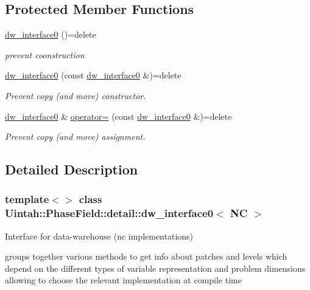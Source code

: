 \subsection*{Protected Member Functions}
\begin{DoxyCompactItemize}
\item 
\hyperlink{classUintah_1_1PhaseField_1_1detail_1_1dw__interface0_3_01NC_01_4_aad7b82c8d10817240284f428f6dbc7ad}{dw\+\_\+interface0} ()=delete
\begin{DoxyCompactList}\small\item\em prevent coonstruction \end{DoxyCompactList}\item 
\hyperlink{classUintah_1_1PhaseField_1_1detail_1_1dw__interface0_3_01NC_01_4_ac163b15aa058e87032713e07a618ccb5}{dw\+\_\+interface0} (const \hyperlink{classUintah_1_1PhaseField_1_1detail_1_1dw__interface0}{dw\+\_\+interface0} \&)=delete
\begin{DoxyCompactList}\small\item\em Prevent copy (and move) constructor. \end{DoxyCompactList}\item 
\hyperlink{classUintah_1_1PhaseField_1_1detail_1_1dw__interface0}{dw\+\_\+interface0} \& \hyperlink{classUintah_1_1PhaseField_1_1detail_1_1dw__interface0_3_01NC_01_4_af04801048a103c1b86d4d90f5d74a61a}{operator=} (const \hyperlink{classUintah_1_1PhaseField_1_1detail_1_1dw__interface0}{dw\+\_\+interface0} \&)=delete
\begin{DoxyCompactList}\small\item\em Prevent copy (and move) assignment. \end{DoxyCompactList}\end{DoxyCompactItemize}


\subsection{Detailed Description}
\subsubsection*{template$<$$>$\newline
class Uintah\+::\+Phase\+Field\+::detail\+::dw\+\_\+interface0$<$ N\+C $>$}

Interface for data-\/warehouse (nc implementations) 

groups together various methods to get info about patches and levels which depend on the different types of variable representation and problem dimensions allowing to choose the relevant implementation at compile time

